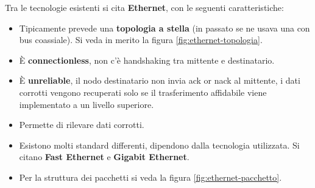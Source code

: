 \documentclass[11pt, italian, openany]{book}
\begin{document}
\begin{sloppypar}
Tra le tecnologie esistenti si cita \textbf{Ethernet}, con le seguenti caratteristiche:
\begin{itemize}[itemsep=0pt,topsep=0pt,parsep=0pt]
	\item Tipicamente prevede una \textbf{topologia a stella} (in passato se ne usava una con bus coassiale). Si veda in merito la figura
	\ref{fig:ethernet-topologia}.
	\item \`E \textbf{connectionless}, non c'\`e handshaking tra mittente e destinatario.
	\item \`E \textbf{unreliable}, il nodo destinatario non invia ack or nack al mittente, i dati corrotti vengono recuperati solo se il trasferimento
	affidabile viene implementato a un livello superiore.
	\item Permette di rilevare dati corrotti.
	\item Esistono molti standard differenti, dipendono dalla tecnologia utilizzata. Si citano \textbf{Fast Ethernet} e \textbf{Gigabit Ethernet}.
	\item Per la struttura dei pacchetti si veda la figura \ref{fig:ethernet-pacchetto}.
\end{itemize}


\end{sloppypar}
\end{document}
